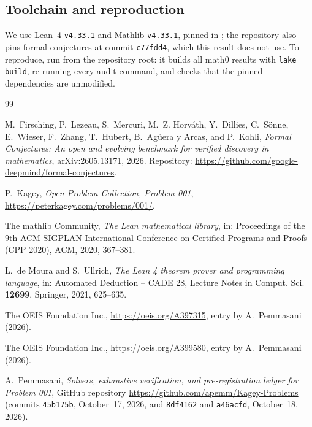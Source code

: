 \documentclass[11pt]{amsart}
\theoremstyle{plain}
\theoremstyle{definition}
\begin{document}
\subsection*{Toolchain and reproduction}
We use Lean~4 \cite{Lean4} \texttt{v4.33.1} and Mathlib \cite{Mathlib} \texttt{v4.33.1}, pinned in ; the repository also pins formal-conjectures \cite{FC} at commit \texttt{c77fdd4}, which this result does not use.
To reproduce, run  from the repository root: it builds all math0 results with \texttt{lake build}, re-running every audit command, and checks that the pinned dependencies are unmodified.

\begin{thebibliography}{99}
\small

M.~Firsching, P.~Lezeau, S.~Mercuri, M.~Z. Horv\'ath, Y.~Dillies, C.~S\"onne, E.~Wieser, F.~Zhang, T.~Hubert, B.~Ag\"uera y Arcas, and P.~Kohli, \emph{Formal Conjectures: An open and evolving benchmark for verified discovery in mathematics}, arXiv:2605.13171, 2026. Repository: \url{https://github.com/google-deepmind/formal-conjectures}.

P.~Kagey, \emph{Open Problem Collection, Problem 001}, \url{https://peterkagey.com/problems/001/}.

The mathlib Community, \emph{The Lean mathematical library}, in: Proceedings of the 9th ACM SIGPLAN International Conference on Certified Programs and Proofs (CPP 2020), ACM, 2020, 367--381.

L.~de Moura and S.~Ullrich, \emph{The Lean 4 theorem prover and programming language}, in: Automated Deduction -- CADE 28, Lecture Notes in Comput. Sci. \textbf{12699}, Springer, 2021, 625--635.

The OEIS Foundation Inc., \url{https://oeis.org/A397315}, entry by A.~Pemmasani (2026).

The OEIS Foundation Inc., \url{https://oeis.org/A399580}, entry by A.~Pemmasani (2026).

A.~Pemmasani, \emph{Solvers, exhaustive verification, and pre-registration ledger for Problem 001}, GitHub repository \url{https://github.com/apemm/Kagey-Problems} (commits \texttt{45b175b}, October~17, 2026, and \texttt{8df4162} and \texttt{a46acfd}, October~18, 2026).

\end{thebibliography}
\end{document}
